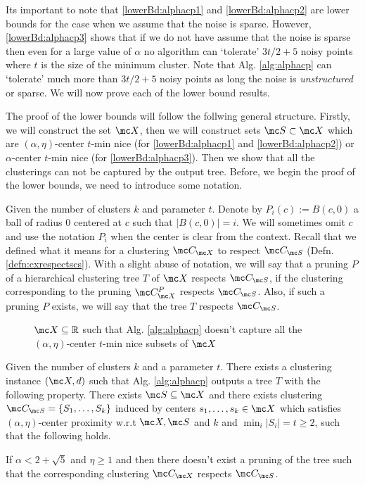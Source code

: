 \documentclass[11pt]{article}
\begin{document}
\noindent Its important to note that \ref{lowerBd:alphacp1} and \ref{lowerBd:alphacp2} are lower bounds for the case when we assume that the noise is sparse. However, \ref{lowerBd:alphacp3} shows that if we do not have assume that the noise is sparse then even for a large value of $\alpha$ no algorithm can `tolerate' $3t/2+5$ noisy points where $t$ is the size of the minimum cluster. Note that Alg. \ref{alg:alphacp} can `tolerate' much more than $3t/2+5$ noisy points as long the noise is {\it unstructured} or sparse. We will now prove each of the lower bound results.

The proof of the lower bounds will follow the follwing general structure. Firstly, we will construct the set $\mc X$, then we will construct sets $\mc S \subset \mc X$ which are $(\alpha, \eta)$-center $t$-min nice (for \ref{lowerBd:alphacp1} and \ref{lowerBd:alphacp2}) or $\alpha$-center $t$-min nice (for \ref{lowerBd:alphacp3}). Then we show that all the clusterings can not be captured by the output tree. Before, we begin the proof of the lower bounds, we need to introduce some notation. 

Given the number of clusters $k$ and parameter $t$. Denote by $P_{i}(c) := B(c, 0)$ a ball of radius $0$ centered at $c$ such that $|B(c, 0)| = i$. We will sometimes omit $c$ and use the notation $P_i$ when the center is clear from the context. Recall that we defined what it means for a clustering $\mc C_{\mc X}$ to respect $\mc C_{\mc S}$ (Defn. \ref{defn:cxrespectscs}). With a slight abuse of notation, we will say that a pruning $P$ of a hierarchical clustering tree $T$ of $\mc X$ respects $\mc C_{\mc S}$, if the clustering corresponding to the pruning $\mc C_{\mc X}^P$ respects $\mc C_{\mc S}$. Also, if such a pruning $P$ exists, we will say that the tree $T$ respects $\mc C_{\mc S}$.

\begin{figure}[!ht]

\caption{$\mc X \subseteq \mathbb{R}$ such that Alg. \ref{alg:alphacp} doesn't capture all the $(\alpha, \eta)$-center $t$-min nice subsets of $\mc X$}
\label{fig:algAlphacp}
\end{figure}

\begin{theorem}
\label{thm:algAlphacp}
Given the number of clusters $k$ and a parameter $t$. There exists a clustering instance $(\mc X, d)$ such that Alg. \ref{alg:alphacp} outputs a tree $T$ with the following property. There exists $\mc S \subseteq \mc X$ and there exists clustering $\mc C_{\mc S} = \{S_1, \ldots, S_k\}$ induced by centers $s_1, \ldots, s_k \in \mc X$ which satisfies $(\alpha, \eta)$-center proximity w.r.t $\mc X, \mc S$ and $k$ and $ \min_i|S_i| = t \ge 2$, such that the following holds. 

If $\alpha < 2 + \sqrt 5$ and $\eta \ge 1$ and then there doesn't exist a pruning of the tree such that the corresponding clustering $\mc C_{\mc X}$ respects $\mc C_{\mc S}$.
\end{theorem}
\end{document}
